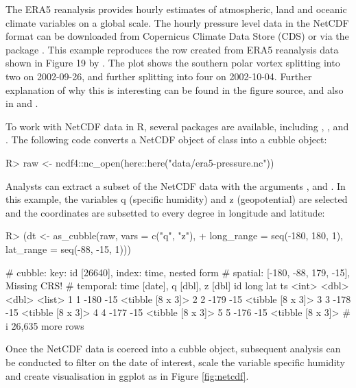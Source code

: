 \documentclass[
  shortnames]{jss}
\begin{document}
The ERA5 reanalysis \citep{hersbach2020era5} provides hourly estimates of atmospheric, land and oceanic climate variables on a global scale. The hourly pressure level data in the NetCDF format can be downloaded from Copernicus Climate Data Store (CDS) \citep{cds} or via the  package \citep{ecwmfr}. This example reproduces the row created from ERA5 reanalysis data shown in Figure 19 by \citet{hersbach2020era5}. The plot shows the southern polar vortex splitting into two on 2002-09-26, and further splitting into four on 2002-10-04. Further explanation of why this is interesting can be found in the figure source, and also in \citet{simmons2020global} and \citet{simmons2005ecmwf}.

To work with NetCDF data in R, several packages are available, including , , and . The following code converts a NetCDF object of class  into a cubble object:

\begin{CodeChunk}
\begin{CodeInput}
R> raw <- ncdf4::nc_open(here::here("data/era5-pressure.nc"))
\end{CodeInput}
\end{CodeChunk}

Analysts can extract a subset of the NetCDF data with the arguments ,  and . In this example, the variables q (specific humidity) and z (geopotential) are selected and the coordinates are subsetted to every degree in longitude and latitude:

\begin{CodeChunk}
\begin{CodeInput}
R> (dt <- as_cubble(raw, vars = c("q", "z"),
+                  long_range = seq(-180, 180, 1), lat_range = seq(-88, -15, 1)))
\end{CodeInput}
\begin{CodeOutput}
# cubble:   key: id [26640], index: time, nested form
# spatial:  [-180, -88, 179, -15], Missing CRS!
# temporal: time [date], q [dbl], z [dbl]
     id  long   lat ts              
  <int> <dbl> <dbl> <list>          
1     1  -180   -15 <tibble [8 x 3]>
2     2  -179   -15 <tibble [8 x 3]>
3     3  -178   -15 <tibble [8 x 3]>
4     4  -177   -15 <tibble [8 x 3]>
5     5  -176   -15 <tibble [8 x 3]>
# i 26,635 more rows
\end{CodeOutput}
\end{CodeChunk}

Once the NetCDF data is coerced into a cubble object, subsequent analysis can be conducted to filter on the date of interest, scale the variable specific humidity and create visualisation in ggplot as in Figure \ref{fig:netcdf}.
\end{document}
